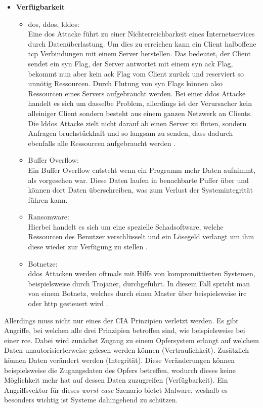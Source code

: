 \documentclass[
    12pt, %
    DIV10,
    ngerman, %
    a4paper, %
    oneside, %
    titlepage, %
    parskip=half, %
    headings=normal, %
    listof=totoc, %
    bibliography=totoc, %
    index=totoc, %
    captions=tableheading, %
    final %
]{scrreprt}
\begin{document}
\begin{itemize}
\item \textbf{Verfügbarkeit}
\begin{itemize}
\item \ac{dos}, \ac{ddos}, \ac{lddos}:\\Eine \ac{dos} Attacke führt zu einer Nichterreichbarkeit eines Internetservices durch Datenüberlastung. Um dies zu erreichen kann ein Client halboffene \ac{tcp} Verbindungen mit einem Server herstellen. Das bedeutet, der Client sendet ein \ac{syn} Flag, der Server antwortet mit einem \ac{syn} \ac{ack} Flag, bekommt nun aber kein \ac{ack} Flag vom Client zurück und reserviert so unnötig Ressourcen. Durch Flutung von \ac{syn} Flags können also Ressourcen eines Servers aufgebraucht werden. Bei einer \ac{ddos} Attacke handelt es sich um dasselbe Problem, allerdings ist der Verursacher kein alleiniger Client sondern besteht aus einem ganzen Netzwerk an Clients. Die \ac{lddos} Attacke zielt nicht darauf ab einen Server zu fluten, sondern Anfragen bruchstückhaft und so langsam zu senden, dass dadurch ebenfalls alle Ressourcen aufgebraucht werden \parencite{siracusano2018detection}.
\item Buffer Overflow:\\Ein Buffer Overflow entsteht wenn ein Programm mehr Daten aufnimmt, als vorgesehen war. Diese Daten laufen in benachbarte Puffer über und können dort Daten überschreiben, was zum Verlust der Systemintegrität führen kann. 
\item Ransomware:\\Hierbei handelt es sich um eine spezielle Schadsoftware, welche Ressourcen des Benutzer verschlüsselt und ein Lösegeld verlangt um ihm diese wieder zur Verfügung zu stellen \parencite{Maniath2018}.
\item Botnetze:\\\ac{ddos} Attacken werden oftmals mit Hilfe von kompromittierten Systemen, beispielsweise durch Trojaner, durchgeführt. In diesem Fall spricht man von einem Botnetz, welches durch einen Master über beispielsweise \ac{irc} oder \ac{http} gesteuert wird \parencite{Mathur2018}.
\end{itemize}
\end{itemize}
Allerdings muss nicht nur eines der CIA Prinzipien verletzt werden. Es gibt Angriffe, bei welchen alle drei Prinzipien betroffen sind, wie beispielsweise bei einer \ac{rce}. Dabei wird zunächst Zugang zu einem Opfersystem erlangt auf welchem Daten unautorisierterweise gelesen werden können (Vertraulichkeit). Zusätzlich können Daten verändert werden (Integrität). Diese Veränderungen können beispielsweise die Zugangsdaten des Opfers betreffen, wodurch dieses keine Möglichkeit mehr hat auf dessen Daten zuzugreifen (Verfügbarkeit). Ein Angriffsvektor für dieses \emph{worst case} Szenario bietet Malware, weshalb es besonders wichtig ist Systeme dahingehend zu schützen.
\end{document}
